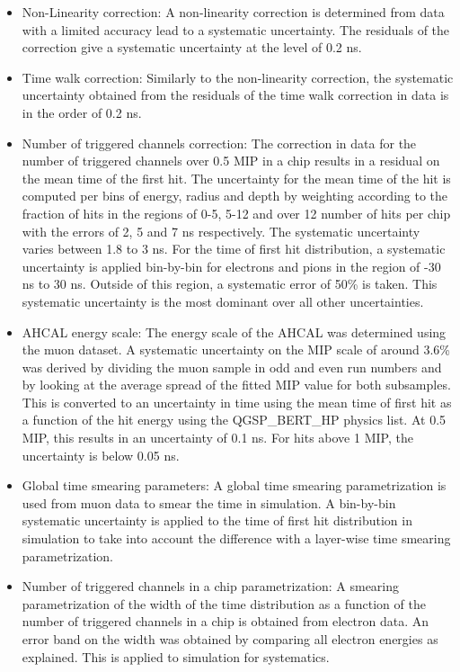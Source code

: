 \documentclass{JINST}
\begin{document}
\begin{itemize}
	\item Non-Linearity correction: A non-linearity correction is determined from data with a limited accuracy lead to a systematic uncertainty. The residuals of the correction give a systematic uncertainty at the level of 0.2 ns.
	\item Time walk correction: Similarly to the non-linearity correction, the systematic uncertainty obtained from the residuals of the time walk correction in data is in the order of 0.2 ns.
	\item Number of triggered channels correction: The correction in data for the number of triggered channels over 0.5 MIP in a chip results in a residual on the mean time of the first hit. The uncertainty for the mean time of the hit is computed per bins of energy, radius and depth by weighting according to the fraction of hits in the regions of 0-5, 5-12 and over 12 number of hits per chip with the errors of 2, 5 and 7 ns respectively. The systematic uncertainty varies between 1.8 to 3 ns. For the time of first hit distribution, a systematic uncertainty is applied bin-by-bin for electrons and pions in the region of -30 ns to 30 ns. Outside of this region, a systematic error of 50\% is taken. This systematic uncertainty is the most dominant over all other uncertainties.
	\item AHCAL energy scale: The energy scale of the AHCAL was determined using the muon dataset. A systematic uncertainty on the MIP scale of around 3.6\% was derived by dividing the muon sample in odd and even run numbers and by looking at the average spread of the fitted MIP value for both subsamples. This is converted to an uncertainty in time using the mean time of first hit as a function of the hit energy using the QGSP\_BERT\_HP physics list. At 0.5 MIP, this results in an uncertainty of 0.1 ns. For hits above 1 MIP, the uncertainty is below 0.05 ns.
	\item Global time smearing parameters: A global time smearing parametrization is used from muon data to smear the time in simulation. A bin-by-bin systematic uncertainty is applied to the time of first hit distribution in simulation to take into account the difference with a layer-wise time smearing parametrization.
	\item Number of triggered channels in a chip parametrization: A smearing parametrization of the width of the time distribution as a function of the number of triggered channels in a chip is obtained from electron data. An error band on the width was obtained by comparing all electron energies as explained. This is applied to simulation for systematics.

\end{itemize}
\end{document}
